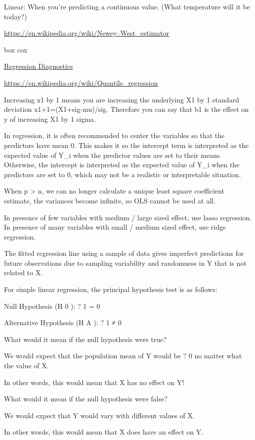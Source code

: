\documentclass[]{book}
\theoremstyle{definition}
\theoremstyle{definition}
\theoremstyle{definition}
\theoremstyle{remark}
\begin{document}
Linear: When you're predicting a continuous value. (What temperature
will it be today?)

\url{https://en.wikipedia.org/wiki/Newey–West_estimator}

box cox

\href{http://www.statmethods.net/stats/rdiagnostics.html}{Regression
Diagnostics}

\url{https://en.wikipedia.org/wiki/Quantile_regression}

Increasing x1 by 1 means you are increasing the underlying X1 by 1
standard deviation x1+1=(X1+sig-mu)/sig. Therefore you can say that b1
is the effect on y of increasing X1 by 1 sigma.

In regression, it is often recommended to center the variables so that
the predictors have mean 0. This makes it so the intercept term is
interpreted as the expected value of Y\_i when the predictor values are
set to their means. Otherwise, the intercept is interpreted as the
expected value of Y\_i when the predictors are set to 0, which may not
be a realistic or interpretable situation.

When p \textgreater{} n, we can no longer calculate a unique least
square coefficient estimate, the variances become infinite, so OLS
cannot be used at all.

In presence of few variables with medium / large sized effect, use lasso
regression. In presence of many variables with small / medium sized
effect, use ridge regression.

The fitted regression line using a sample of data gives imperfect
predictions for future observations due to sampling variability and
randomness in Y that is not related to X.

For simple linear regression, the principal hypothesis test is as
follows:

Null Hypothesis (H 0 ): ? 1 = 0

Alternative Hypothesis (H A ): ? 1 ≠ 0

What would it mean if the null hypothesis were true?

We would expect that the population mean of Y would be ? 0 no matter
what the value of X.

In other words, this would mean that X has no effect on Y!

What would it mean if the null hypothesis were false?

We would expect that Y would vary with different values of X.

In other words, this would mean that X does have an effect on Y.
\end{document}
